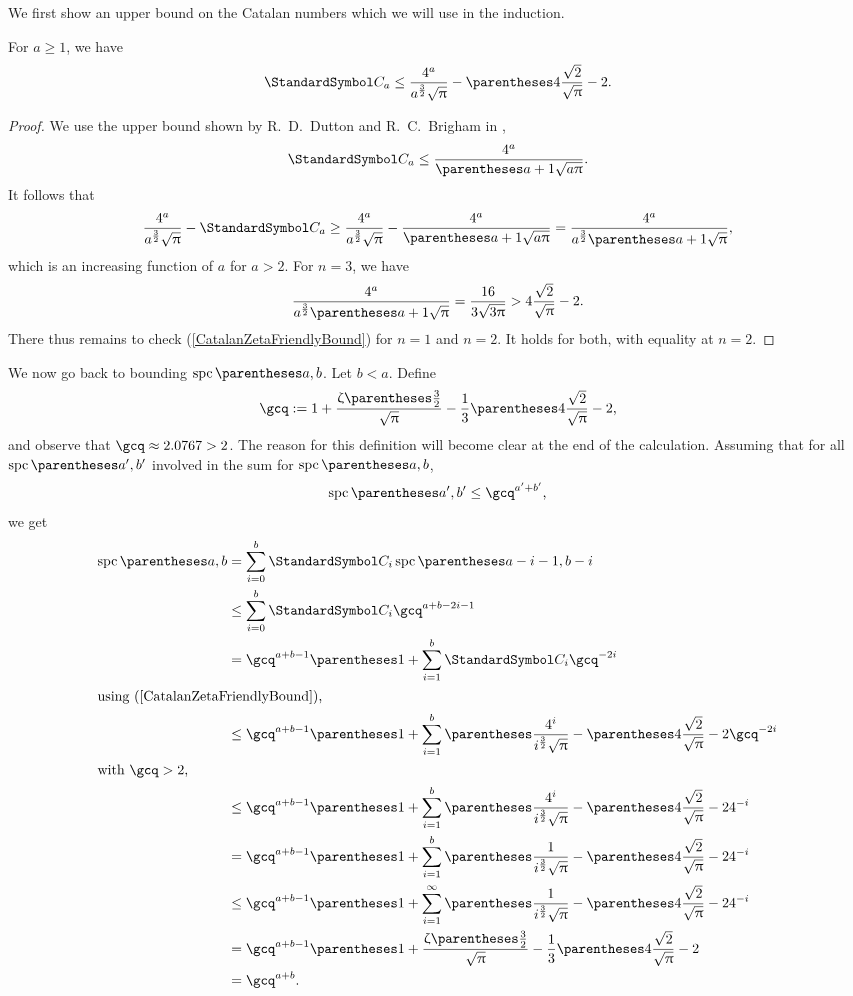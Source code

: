 We first show an upper bound on the Catalan numbers which we will use in the induction.
\begin{remark}
For $a\geq 1$, we have\begin{equation}
\CatalanNumber a \leq \frac{4^a}{a^{\frac 3 2}\sqrt{\Pi}}-\pa{4\frac {\sqrt 2} {\sqrt \Pi}-2} \text.\label{CatalanZetaFriendlyBound}
\end{equation}
\begin{proof}
We use the upper bound shown by R.~D.~Dutton and R.~C.~Brigham in \cite{DuttonBrigham1986},\[
\CatalanNumber a\leq \frac{4^a}{\pa{a+1}\sqrt{a\Pi}}\text.
\]
It follows that\[
\frac{4^a}{a^{\frac 3 2}\sqrt{\Pi}} - \CatalanNumber a \geq \frac{4^a}{a^{\frac 3 2}\sqrt{\Pi}} - \frac{4^a}{\pa{a+1}\sqrt{a\Pi}} = \frac{4^a}{a^{\frac 3 2}\pa{a+1}\sqrt{\Pi}}\text,
\]
which is an increasing function of $a$ for $a>2$. For $n=3$, we have\[
\frac{4^a}{a^{\frac 3 2}\pa{a+1}\sqrt{\Pi}}=\frac{16}{3\sqrt{3\Pi}}>4\frac {\sqrt 2} {\sqrt \Pi}-2\text.
\]
There thus remains to check (\ref{CatalanZetaFriendlyBound}) for $n=1$ and $n=2$. It holds for both, with equality at $n=2$.
\end{proof}
\end{remark}
We now go back to bounding $\spc\of{a,b}$.
Let $b<a$. Define\[
\gcq\DefineAs 1+\frac{\RiemannZeta\of{\frac 3 2}}{\sqrt{\Pi}}-\frac{1}{3}\pa{4\frac {\sqrt 2} {\sqrt \Pi}-2}\text,
\]
and observe that $\gcq\approx 2.0767 > 2$. The reason for this definition will become clear at the end of the calculation.
Assuming that for all $\spc\of{a',b'}$ involved in the sum
for $\spc\of{a,b}$,\[
\spc\of{a',b'}\leq\gcq^{a'+b'}\text,
\]
we get\begin{align*}
\spc\of{a,b} &= \sum{i=0}[b] \CatalanNumber {i} \spc\of{a-i-1,b-i} \\
 &\leq \sum{i=0}[b] \CatalanNumber {i} \gcq^{a+b-2i-1} \\
 &= \gcq^{a+b-1}\pa{1+\sum{i=1}[b] \CatalanNumber {i} \gcq^{-2i}}\\
\intertext{using (\ref{CatalanZetaFriendlyBound}),}
 &\leq \gcq^{a+b-1}\pa{1+\sum{i=1}[b] \pa{\frac{4^i}{i^{\frac 3 2}\sqrt{\Pi}}-\pa{4\frac {\sqrt 2} {\sqrt \Pi}-2}} \gcq^{-2i}} \\
\intertext{with $\gcq > 2$,}
 &\leq \gcq^{a+b-1}\pa{1+\sum{i=1}[b] \pa{\frac{4^i}{i^{\frac 3 2}\sqrt{\Pi}}-\pa{4\frac {\sqrt 2} {\sqrt \Pi}-2}} 4^{-i}} \\
 &= \gcq^{a+b-1}\pa{1+\sum{i=1}[b] \pa{\frac{1}{i^{\frac 3 2}\sqrt{\Pi}}-\pa{4\frac {\sqrt 2} {\sqrt \Pi}-2} 4^{-i}}} \\
 &\leq \gcq^{a+b-1}\pa{1+\sum{i=1}[\infty] \pa{\frac{1}{i^{\frac 3 2}\sqrt{\Pi}}-\pa{4\frac {\sqrt 2} {\sqrt \Pi}-2} 4^{-i}}} \\
 &= \gcq^{a+b-1}\pa{1+\frac{\RiemannZeta\of{\frac 3 2}}{\sqrt{\Pi}}-\frac{1}{3}\pa{4\frac {\sqrt 2} {\sqrt \Pi}-2}} \\
 &= \gcq^{a+b}\text.
\end{align*}
